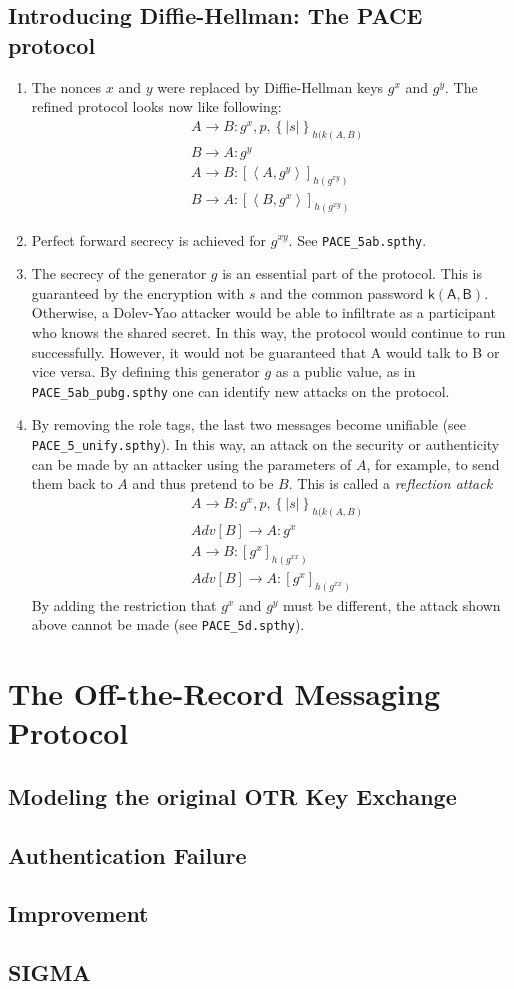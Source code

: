 \documentclass[a4paper,11pt]{scrartcl}
\newcommand{\tuple}[1]{\left\langle #1\right\rangle}
\begin{document}
\subsection{Introducing Diffie-Hellman: The PACE protocol}
\begin{enumerate}[label=\alph*)]
	\item The nonces $x$ and $y$ were replaced by Diffie-Hellman keys $g^x$ and $g^y$. The refined protocol looks now like following:
	  \begin{align*}
    		&A \rightarrow B: g^x, p, \left\lbrace | s | \right\rbrace_{h(k(A,  B)}\\
		&B \rightarrow A: g^y\\
		&A \rightarrow B: [\tuple{A,  g^y}]_{h(g^{xy})}\\
		&B \rightarrow A: [\tuple{B,  g^x}]_{h(g^{xy})}
  	\end{align*}
	\item Perfect forward secrecy is achieved for $g^{xy}$.  See \texttt{PACE\_5ab.spthy}.
	\item The secrecy of the generator $g$ is an essential part of the protocol. This is guaranteed by the encryption with $s$ and the common password $\mathsf{k(A,B)}$.  Otherwise, a Dolev-Yao attacker would be able to infiltrate as a participant who knows the shared secret.  In this way, the protocol would continue to run successfully. However, it would not be guaranteed that A would talk to B or vice versa.  By defining this generator $g$ as a public value, as in \texttt{PACE\_5ab\_pubg.spthy} one can identify new attacks on the protocol.
	\item By removing the role tags, the last two messages become unifiable (see \texttt{PACE\_5\_unify.spthy}).  In this way,  an attack on the security or authenticity can be made by an attacker using the parameters of $A$,  for example, to send them back to $A$ and thus pretend to be $B$. This is called a \emph{reflection attack}
	\begin{align*}
    		&A \rightarrow B: g^x, p, \left\lbrace | s | \right\rbrace_{h(k(A,  B)}\\
		&Adv[B] \rightarrow A: g^x\\
		&A \rightarrow B: [g^x]_{h(g^{xx})}\\
		&Adv[B] \rightarrow A: [g^x]_{h(g^{xx})}
  	\end{align*}
	By adding the restriction that $g^x$ and $g^y$ must be different,  the attack shown above cannot be made (see \texttt{PACE\_5d.spthy}).
\end{enumerate}
\section{The Off-the-Record Messaging Protocol}
\subsection{Modeling the original OTR Key Exchange}
\subsection{Authentication Failure}
\subsection{Improvement}
\subsection{SIGMA}
\end{document}
